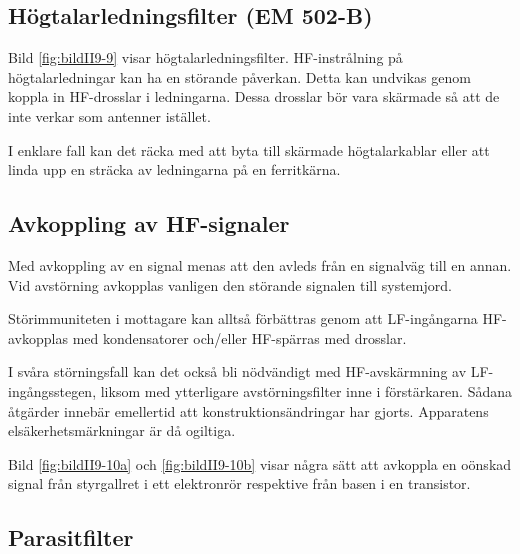 \subsection{Högtalarledningsfilter (EM 502-B)}

Bild \ref{fig:bildII9-9} visar högtalarledningsfilter.
HF-instrålning på högtalarledningar kan ha en störande påverkan.
Detta kan undvikas genom koppla in HF-drosslar i ledningarna.
Dessa drosslar bör vara skärmade så att de inte verkar som antenner istället.

I enklare fall kan det räcka med att byta till skärmade högtalarkablar
eller att linda upp en sträcka av ledningarna på en ferritkärna.

\subsection{Avkoppling av HF-signaler}




Med avkoppling av en signal menas att den avleds från en signalväg till en
annan.
Vid avstörning avkopplas vanligen den störande signalen till systemjord.

Störimmuniteten i mottagare kan alltså förbättras genom att LF-ingångarna
HF-avkopplas med kondensatorer och/eller HF-spärras med drosslar.

I svåra störningsfall kan det också bli nödvändigt med HF-avskärmning av
LF-ingångsstegen, liksom med ytterligare avstörningsfilter inne i förstärkaren.
Sådana åtgärder innebär emellertid att konstruktionsändringar har gjorts.
Apparatens elsäkerhetsmärkningar är då ogiltiga.

Bild \ref{fig:bildII9-10a} och \ref{fig:bildII9-10b} visar några sätt att
avkoppla en oönskad signal från styrgallret i ett elektronrör respektive från
basen i en transistor.

\subsection{Parasitfilter}

